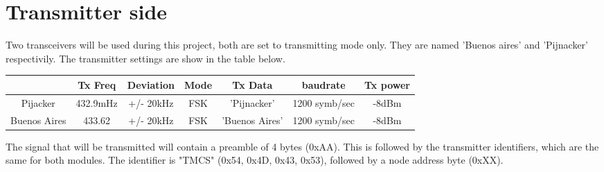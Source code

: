 \chapter{Transmitter side}

Two transceivers will be used during this project, both are set to transmitting mode only. They are named 'Buenos aires' and 'Pijnacker' respectivily. The transmitter settings are show in the table below.

\begin{tabular}{|c|c|c|c|c|c|c|}
	\hline   & Tx Freq & Deviation & Mode & Tx Data & baudrate & Tx power \\ 
	\hline Pijacker & 432.9mHz & +/- 20kHz & FSK & 'Pijnacker' & 1200 symb/sec & -8dBm\\ 
	\hline Buenos Aires & 433.62 & +/- 20kHz & FSK & 'Buenos Aires' & 1200 symb/sec & -8dBm\\ 
	\hline 
\end{tabular} 

The signal that will be transmitted will contain a preamble of 4 bytes (0xAA).  This is followed by the transmitter identifiers, which are the same for both modules. The identifier is "TMCS" (0x54, 0x4D, 0x43, 0x53), followed by a node address byte (0xXX). 